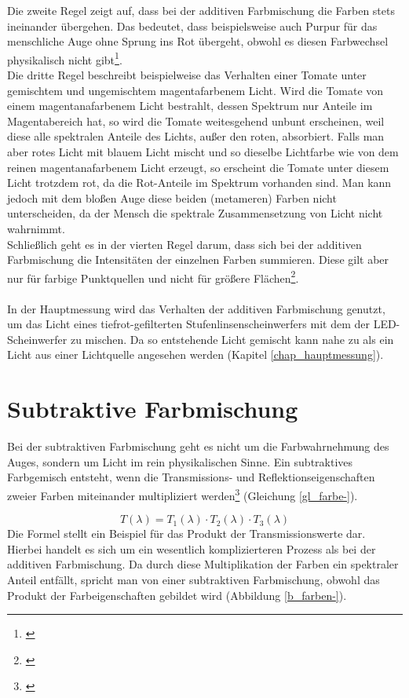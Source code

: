 \noindent Die zweite Regel zeigt auf, dass bei der additiven Farbmischung die Farben stets ineinander übergehen. Das bedeutet, dass beispielsweise auch Purpur für das menschliche Auge ohne Sprung ins Rot übergeht, obwohl es diesen Farbwechsel physikalisch nicht gibt\footnote{\cite[5]{mungenast}}.\\
Die dritte Regel beschreibt beispielweise das Verhalten einer Tomate unter gemischtem und ungemischtem magentafarbenem Licht. Wird die Tomate von einem magentanafarbenem Licht bestrahlt, dessen Spektrum nur Anteile im Magentabereich hat, so wird die Tomate weitesgehend unbunt erscheinen, weil diese alle spektralen Anteile des Lichts, außer den roten, absorbiert. Falls man aber rotes Licht mit blauem Licht mischt und so dieselbe Lichtfarbe wie von dem reinen magentanafarbenem Licht erzeugt, so erscheint die Tomate unter diesem Licht trotzdem rot, da die Rot-Anteile im Spektrum vorhanden sind. Man kann jedoch mit dem bloßen Auge diese beiden (metameren) Farben nicht unterscheiden, da der Mensch die spektrale Zusammensetzung von Licht nicht wahrnimmt.\\
Schließlich geht es in der vierten Regel darum, dass sich bei der additiven Farbmischung die Intensitäten der einzelnen Farben summieren. Diese gilt aber nur für farbige  Punktquellen und nicht für größere Flächen\footnote{\cite[5]{mungenast}}.\\\\
In der Hauptmessung wird das Verhalten der additiven Farbmischung genutzt, um das Licht eines tiefrot-gefilterten Stufenlinsenscheinwerfers mit dem der LED-Scheinwerfer zu mischen. Da so entstehende Licht gemischt kann nahe zu als ein Licht aus einer Lichtquelle angesehen werden (Kapitel \ref{chap_hauptmessung}).


\newpage

\section{Subtraktive Farbmischung} \label{sec_farbmischung-}
\noindent Bei der subtraktiven Farbmischung geht es nicht um die Farbwahrnehmung des Auges, sondern um Licht im rein physikalischen Sinne. Ein subtraktives Farbgemisch entsteht, wenn die Transmissions- und Reflektionseigenschaften zweier Farben miteinander multipliziert werden\footnote{\cite[84]{greule}} (Gleichung \ref{gl_farbe-}).

\begin{equation}\label{gl_farbe-}
		T(\lambda) = T_{1}(\lambda) \cdot T_{2}(\lambda) \cdot T_{3}(\lambda)
	\end{equation}
Die Formel stellt ein Beispiel für das Produkt der Transmissionswerte dar.
Hierbei handelt es sich um ein wesentlich komplizierteren Prozess als bei der additiven Farbmischung. Da durch diese Multiplikation der Farben ein spektraler Anteil entfällt, spricht man von einer subtraktiven Farbmischung, obwohl das Produkt der Farbeigenschaften gebildet wird (Abbildung \ref{b_farben-}).

